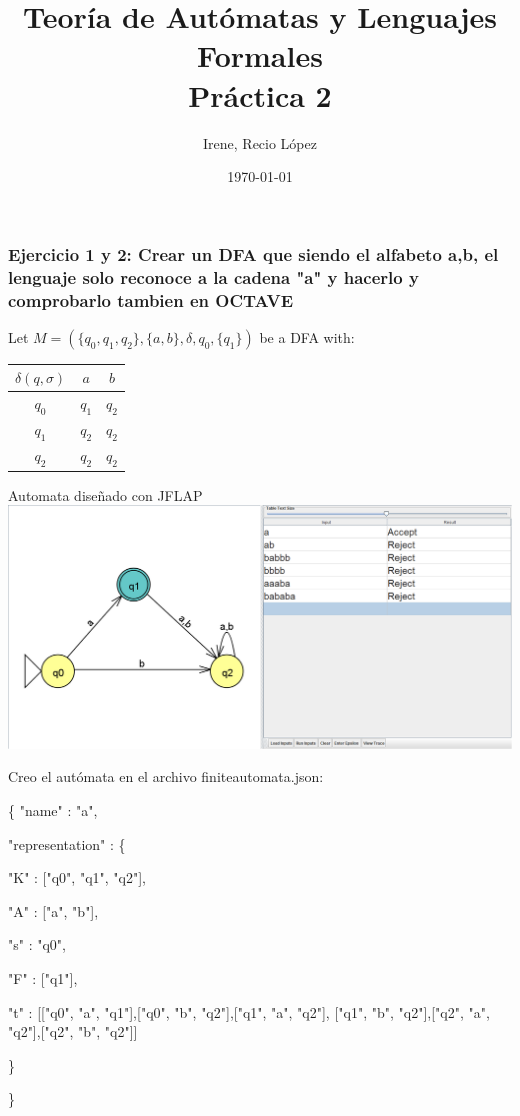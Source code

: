 \documentclass[fleqn, 10pt]{article}
\title{Teoría de Autómatas y Lenguajes Formales\\[.4\baselineskip]Práctica 2}
\author{Irene, Recio López}
\date{\today}
\theoremstyle{plain}
\theoremstyle{definition}
\begin{document}
\maketitle

\subsubsection*{Ejercicio 1 y 2: Crear un DFA que siendo el alfabeto {a,b}, el lenguaje solo reconoce a la cadena "a" y hacerlo y comprobarlo tambien en OCTAVE}
\begin{center}
Let $M=(\{q_0,q_1,q_2\}, \{a,b\}, \delta, q_0, \{q_1\})$ be a DFA with:\\

\begin{table}[h!]
\begin{tabular}{c|c|c}
 $\delta(q,\sigma)$ & $a$ & $b$
\\
 \hline
 $q_0$& $q_1$ & $q_2$\\
  \hline
  $q_1$& $q_2$ & $q_2$\\
  \hline
  $q_2$& $q_2$ & $q_2$
\end{tabular}
\end{table} 
\end{center}
Automata diseñado con JFLAP
\\
	\centering
	\includegraphics[scale=0.2]{resultados}

\begin{flushleft}
Creo el autómata en el archivo finiteautomata.json:

\{
    "name" : "a",
    
    "representation" : \{
    
      "K" : ["q0", "q1", "q2"],
      
      "A" : ["a", "b"],
      
      "s" : "q0",
      
      "F" : ["q1"],
      
      "t" : [["q0", "a", "q1"],["q0", "b", "q2"],["q1", "a", "q2"], 		["q1", "b", "q2"],["q2", "a", "q2"],["q2", "b", "q2"]]
             
       \}
      
\}

\end{flushleft}
\end{document}
